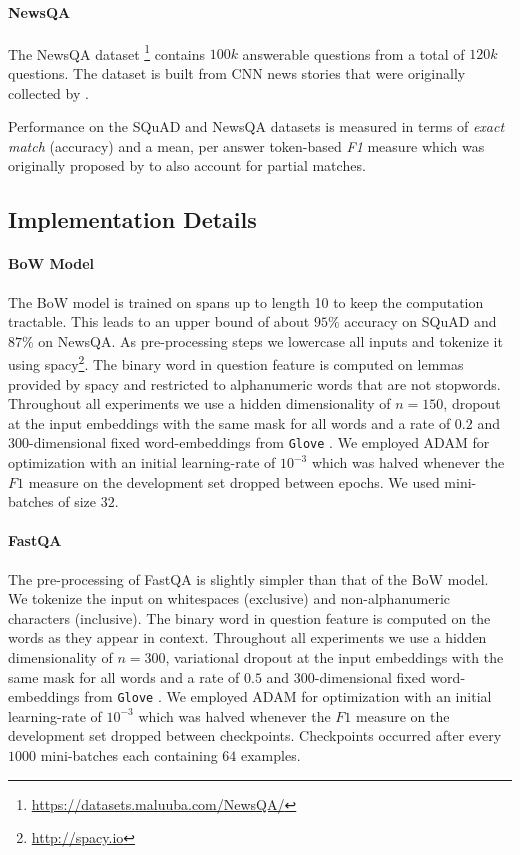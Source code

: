 \documentclass[11pt,a4paper]{article}
\begin{document}
\paragraph{NewsQA} The NewsQA dataset \cite{Trischler2017}\footnote{\url{https://datasets.maluuba.com/NewsQA/}} contains $100k$ answerable questions from a total of $120k$ questions. The dataset is built from CNN news stories that were originally collected by .

Performance on the SQuAD and NewsQA datasets is measured in terms of \textit{exact match} (accuracy) and a mean, per answer token-based \textit{F1} measure which was originally proposed by  to also account for partial matches.

\subsection{Implementation Details}

\paragraph{BoW Model}

The BoW model is trained on spans up to length 10 to keep the computation tractable. This leads to an upper bound of about $95\%$ accuracy on SQuAD and $87\%$ on NewsQA. As pre-processing steps we lowercase all inputs and tokenize it using spacy\footnote{\url{http://spacy.io}}. The binary word in question feature is computed on lemmas provided by spacy and restricted to alphanumeric words that are not stopwords.
Throughout all experiments we use a hidden dimensionality of $n=150$, dropout at the input embeddings with the same mask for all words \cite{Gal2015} and a rate of $0.2$ and $300$-dimensional fixed word-embeddings from \verb|Glove| \cite{Pennington2014}. We employed ADAM \cite{Kingma2015} for optimization with an initial learning-rate of $10^{-3}$ which was halved whenever the $F1$ measure on the development set dropped between epochs. We used mini-batches of size $32$.

\paragraph{FastQA}

The pre-processing of FastQA is slightly simpler than that of the BoW model. We tokenize the input on whitespaces (exclusive) and non-alphanumeric characters (inclusive). The binary word in question feature is computed on the words as they appear in context.
Throughout all experiments we use a hidden dimensionality of $n=300$, variational dropout at the input embeddings with the same mask for all words \cite{Gal2015} and a rate of $0.5$ and $300$-dimensional fixed word-embeddings from \verb|Glove| \cite{Pennington2014}. We employed ADAM \cite{Kingma2015} for optimization with an initial learning-rate of $10^{-3}$ which was halved whenever the $F1$ measure on the development set dropped between checkpoints. Checkpoints occurred after every $1000$ mini-batches each containing $64$ examples.
\end{document}
